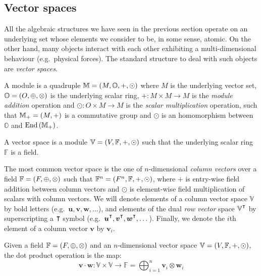 \subsection{Vector spaces}
All the algebraic structures we have seen in the previous section operate on an underlying set 
whose elements we consider to be, in some sense, atomic.
On the other hand, many objects interact with each other exhibiting a multi-dimensional behaviour 
(e.g.\ physical forces).
The standard structure to deal with such objects are \emph{vector spaces}.
\begin{definition}[Module]
  A module is a quadruple \(\mathbb{M} = \left(M, \mathbb{O}, +, \odot\right)\) where 
  \(M\) is the underlying vector set, \(\mathbb{O} = \left(O, \oplus, \otimes\right)\) is the underlying 
  scalar ring, \(+\colon M \times M \to M\) is the \emph{module addition} operation and 
  \(\odot\colon O \times M \to M\) is the \emph{scalar multiplication} operation, such 
  that \(\mathbb{M}_{+} = \left(M, +\right)\) is a commutative group and \(\odot \) is an 
  homomorphism between \(\mathbb{O}\) and \(\mathrm{End}\left(\mathbb{M}_{+}\right)\).
\end{definition} 

\begin{definition}
  A vector space is a module \(\mathbb{V} = \left(V, \mathbb{F}, +, \odot\right)\) such that the 
  underlying scalar ring \(\mathbb{F}\) is a field.
\end{definition} 

The most common vector space is the one of \(n\)-dimensional \emph{column vectors} over a 
field \(\mathbb{F} = \left(F, \oplus, \otimes\right)\) such that \(\mathbb{F}^n = 
\left(F^n, \mathbb{F}, +, \odot\right)\), where \(+\) is entry-wise field addition between 
column vectors and \(\odot \) is element-wise field multiplication of scalars with column vectors.
We will denote elements of a column vector space \(\mathbb{V}\) by bold letters 
(e.g.\  \(\bm{u}, \bm{v}, \bm{w}, \dots \)), and elements of the dual \emph{row vector} space 
\(\mathbb{V}^{\transpose}\) by superscripting a \(\transpose \) symbol
(e.g.\  \(\bm{u}^{\transpose}, \bm{v}^{\transpose}, \bm{w}^{\transpose}, \dots \)). 
Finally, we denote the \(i\)th element of a column vector \(\bm{v}\) by \(\bm{v}_i\).
\begin{definition}
  Given a field \(\mathbb{F} = \left(F, \oplus, \otimes\right)\) and an \(n\)-dimensional vector space 
  \(\mathbb{V} = \left(V, \mathbb{F}, +, \odot\right)\), the dot product operation is the map:
  \[
    \bm{v} \cdot \bm{w}\colon \mathbb{V} \times \mathbb{V} \to \mathbb{F} = 
    \bigoplus_{i = 1}^{n}{\bm{v}_i \otimes \bm{w}_i}
  \]
\end{definition}

